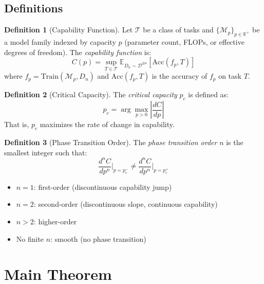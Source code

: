 \documentclass[12pt]{article}
\newcommand{\E}{\mathbb{E}}
\newcommand{\Mcal}{\mathcal{M}}
\newcommand{\Tcal}{\mathcal{T}}
\newcommand{\Dcal}{\mathcal{D}}
\theoremstyle{definition}
\newtheorem{definition}{Definition}[section]
\theoremstyle{remark}
\begin{document}
\subsection{Definitions}

\begin{definition}[Capability Function]
Let $\Tcal$ be a class of tasks and $\{\Mcal_p\}_{p \in \mathbb{R}^+}$ be a model family indexed by capacity $p$ (parameter count, FLOPs, or effective degrees of freedom). The \emph{capability function} is:
\begin{equation}
C(p) = \sup_{T \in \Tcal} \E_{D_n \sim \Dcal^{\otimes n}}[\mathrm{Acc}(f_p, T)]
\end{equation}
where $f_p = \mathrm{Train}(\Mcal_p, D_n)$ and $\mathrm{Acc}(f_p, T)$ is the accuracy of $f_p$ on task $T$.
\end{definition}

\begin{definition}[Critical Capacity]
The \emph{critical capacity} $p_c$ is defined as:
\begin{equation}
p_c = \arg\max_{p > 0} \left| \frac{dC}{dp} \right|
\end{equation}
That is, $p_c$ maximizes the rate of change in capability.
\end{definition}

\begin{definition}[Phase Transition Order]
The \emph{phase transition order} $n$ is the smallest integer such that:
\begin{equation}
\frac{d^n C}{dp^n} \Big|_{p = p_c^-} \neq \frac{d^n C}{dp^n} \Big|_{p = p_c^+}
\end{equation}
\begin{itemize}
  \item $n = 1$: first-order (discontinuous capability jump)
  \item $n = 2$: second-order (discontinuous slope, continuous capability)
  \item $n > 2$: higher-order
  \item No finite $n$: smooth (no phase transition)
\end{itemize}
\end{definition}

\section{Main Theorem}
\end{document}
